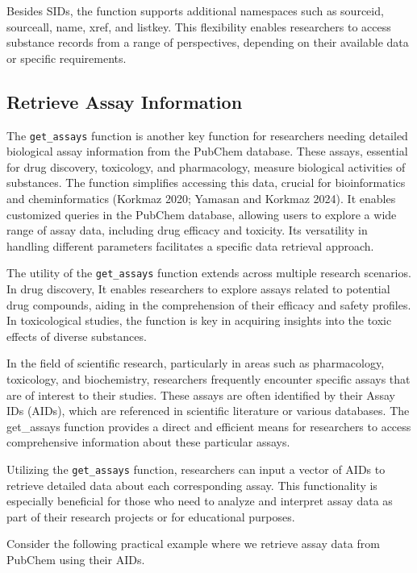 Besides SIDs, the function supports additional namespaces such as sourceid, sourceall, name, xref, and listkey. This flexibility enables researchers to access substance records from a range of perspectives, depending on their available data or specific requirements.

\hypertarget{retrieve-assay-information}{%
\subsection{Retrieve Assay Information}\label{retrieve-assay-information}}

The \texttt{get\_assays} function is another key function for researchers needing detailed biological assay information from the PubChem database. These assays, essential for drug discovery, toxicology, and pharmacology, measure biological activities of substances. The function simplifies accessing this data, crucial for bioinformatics and cheminformatics (Korkmaz 2020; Yamasan and Korkmaz 2024). It enables customized queries in the PubChem database, allowing users to explore a wide range of assay data, including drug efficacy and toxicity. Its versatility in handling different parameters facilitates a specific data retrieval approach.

The utility of the \texttt{get\_assays} function extends across multiple research scenarios. In drug discovery, It enables researchers to explore assays related to potential drug compounds, aiding in the comprehension of their efficacy and safety profiles. In toxicological studies, the function is key in acquiring insights into the toxic effects of diverse substances.

In the field of scientific research, particularly in areas such as pharmacology, toxicology, and biochemistry, researchers frequently encounter specific assays that are of interest to their studies. These assays are often identified by their Assay IDs (AIDs), which are referenced in scientific literature or various databases. The get\_assays function provides a direct and efficient means for researchers to access comprehensive information about these particular assays.

Utilizing the \texttt{get\_assays} function, researchers can input a vector of AIDs to retrieve detailed data about each corresponding assay. This functionality is especially beneficial for those who need to analyze and interpret assay data as part of their research projects or for educational purposes.

Consider the following practical example where we retrieve assay data from PubChem using their AIDs.

